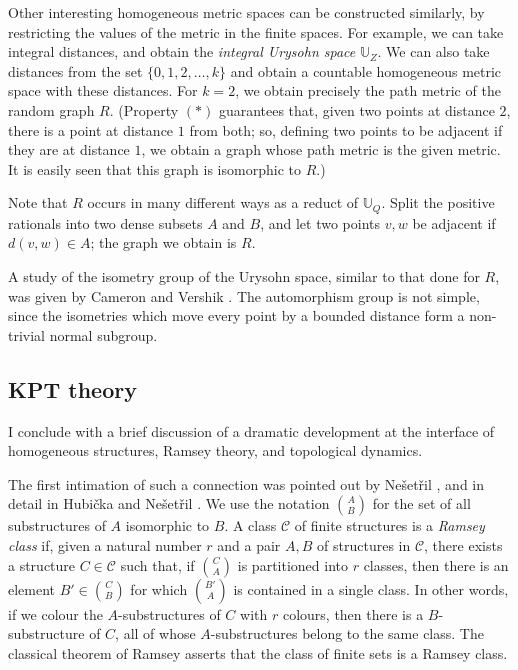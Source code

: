 \documentclass{book}
\begin{document}
Other interesting homogeneous metric spaces can be constructed similarly,
by restricting the values of the metric in the finite spaces. For example,
we can take integral distances, and obtain the \emph{integral Urysohn space}
$\mathbb{U}_Z$. We can also take distances from the set $\{0,1,2,\ldots,k\}$
and obtain a countable homogeneous metric space with these distances. For
$k=2$, we obtain precisely the path metric of the random graph $R$. (Property
$(\ast)$ guarantees that, given two points at distance $2$, there is a point
at distance $1$ from both; so, defining two points to be adjacent if they are
at distance $1$, we obtain a graph whose path metric is the given metric. It
is easily seen that this graph is isomorphic to $R$.)

Note that $R$ occurs
in many different ways as a reduct of $\mathbb{U}_Q$. Split the positive
rationals into two dense subsets $A$ and $B$, and let two points $v,w$ be
adjacent if $d(v,w)\in A$; the graph we obtain is $R$.

A study of the isometry group of the Urysohn space, similar to that done for
$R$, was given by Cameron and Vershik \cite{ch32:new7}. The automorphism
group is not simple, since the isometries which move every point by a bounded
distance form a non-trivial normal subgroup.

\subsection{KPT theory}

I conclude with a brief discussion of a dramatic development at the interface
of homogeneous structures, Ramsey theory, and topological dynamics.

The first intimation of such a connection was pointed out by 
Ne\v{s}et\v{r}il \cite{ch32:new10}, and in detail in Hubi\v{c}ka and
Ne\v{s}et\v{r}il \cite{ch32:new9}. We use the notation $A\choose B$ for the
set of all substructures of $A$ isomorphic to $B$. A class $\mathcal{C}$ of
finite structures is a \emph{Ramsey class} if, given a natural number $r$ and
a pair $A,B$ of structures in $\mathcal{C}$, there exists a structure
$C\in\mathcal{C}$ such that, if $C\choose A$ is partitioned into $r$
classes, then there is an element $B'\in{C\choose B}$ for which $B'\choose A$
is contained in a single class. In other words, if we colour the
$A$-substructures of $C$ with $r$ colours, then there is a $B$-substructure
of $C$, all of whose $A$-substructures belong to the same class. The
classical theorem of Ramsey asserts that the class of finite sets is a
Ramsey class.
\end{document}
